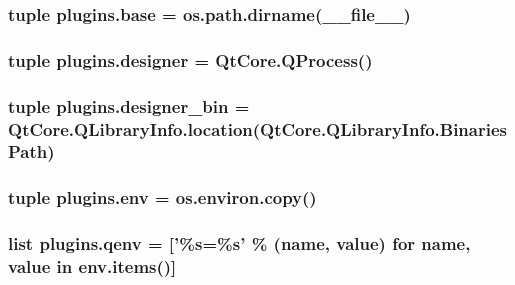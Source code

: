\subsubsection[{base}]{\setlength{\rightskip}{0pt plus 5cm}tuple plugins.\+base = os.\+path.\+dirname(\+\_\+\+\_\+file\+\_\+\+\_\+)}\label{namespaceplugins_a3fd3ca789a728fdb7c30556d62947f38}
\hypertarget{namespaceplugins_a44e1bde0a42fc0e777e41ad4a32463f7}{}
\subsubsection[{designer}]{\setlength{\rightskip}{0pt plus 5cm}tuple plugins.\+designer = Qt\+Core.\+Q\+Process()}\label{namespaceplugins_a44e1bde0a42fc0e777e41ad4a32463f7}
\hypertarget{namespaceplugins_a1a51d09b247c9d4905043a7a95e9b519}{}
\subsubsection[{designer\+\_\+bin}]{\setlength{\rightskip}{0pt plus 5cm}tuple plugins.\+designer\+\_\+bin = Qt\+Core.\+Q\+Library\+Info.\+location(Qt\+Core.\+Q\+Library\+Info.\+Binaries\+Path)}\label{namespaceplugins_a1a51d09b247c9d4905043a7a95e9b519}
\hypertarget{namespaceplugins_a1fe16c04b703ae979711d6a18495e54e}{}
\subsubsection[{env}]{\setlength{\rightskip}{0pt plus 5cm}tuple plugins.\+env = os.\+environ.\+copy()}\label{namespaceplugins_a1fe16c04b703ae979711d6a18495e54e}
\hypertarget{namespaceplugins_a22af2107e74b56e5128176d61884224c}{}
\subsubsection[{qenv}]{\setlength{\rightskip}{0pt plus 5cm}list plugins.\+qenv = \mbox{[}'\%{\bf s}=\%{\bf s}' \% (name, value) for name, value in env.\+items()\mbox{]}}\label{namespaceplugins_a22af2107e74b56e5128176d61884224c}
